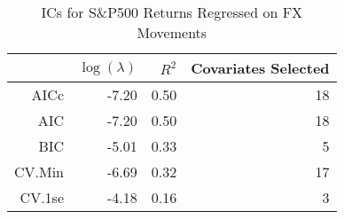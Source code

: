 \begin{table}[ht]
\centering
\begin{tabular}{rrrr}
  \hline
 & $\log(\lambda)$ & $R^2$ & Covariates Selected \\ 
  \hline
AICc & -7.20 & 0.50 &  18 \\ 
  AIC & -7.20 & 0.50 &  18 \\ 
  BIC & -5.01 & 0.33 &   5 \\ 
  CV.Min & -6.69 & 0.32 &  17 \\ 
  CV.1se & -4.18 & 0.16 &   3 \\ 
   \hline
\end{tabular}
\caption{ICs for S\&P500 Returns Regressed on FX Movements} 
\label{tab:spregfx_ics}
\end{table}
